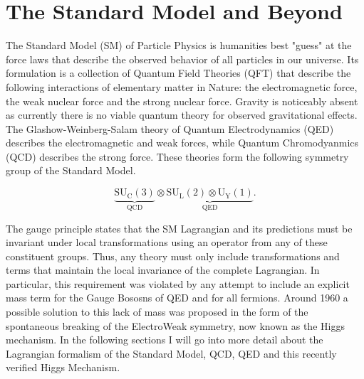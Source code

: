 \chapter{The Standard Model and Beyond} \label{chap:standard_model}

The Standard Model (SM) of Particle Physics is humanities best "guess" at the
force laws that describe the observed behavior of all particles in our
universe. Its formulation is a collection of Quantum Field Theories (QFT) that
describe the following interactions of elementary matter in Nature: the
electromagnetic force, the weak nuclear force and the strong nuclear force.
Gravity is noticeably absent as currently there is no viable quantum theory for
observed gravitational effects.  The Glashow-Weinberg-Salam theory of Quantum
Electrodynamics (QED) describes the electromagnetic and weak forces, while
Quantum Chromodyanmics (QCD) describes the strong force.  These theories form
the following symmetry group of the Standard Model.

\begin{equation} \label{eq:standardmodel:symmetry_group}
  \underbrace{\text{SU}_\text{C}(3)}_\text{QCD} \otimes \underbrace{\text{SU}_\text{L}(2) \otimes \text{U}_\text{Y}(1)}_\text{QED}.
\end{equation}

The gauge principle states that the SM Lagrangian and its predictions must be
invariant under local transformations using an operator from any of these
constituent groups.  Thus, any theory must only include transformations and
terms that maintain the local invariance of the complete Lagrangian.  In
particular, this requirement was violated by any attempt to include an explicit
mass term for the Gauge Bososns of QED and for all fermions.  Around 1960 a
possible solution to this lack of mass was proposed in the form of the
spontaneous breaking of the ElectroWeak symmetry, now known as the Higgs
mechanism.  In the following sections I will go into more detail about the
Lagrangian formalism of the Standard Model, QCD, QED and this recently verified
Higgs Mechanism.








